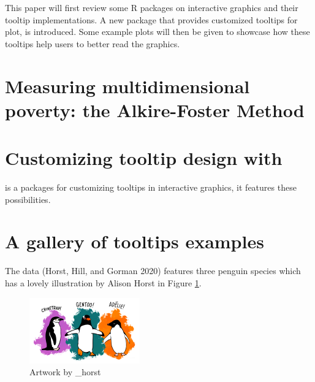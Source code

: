 This paper will first review some R packages on interactive graphics and their tooltip implementations. A new package  that provides customized tooltips for plot, is introduced. Some example plots will then be given to showcase how these tooltips help users to better read the graphics.

\hypertarget{measuring-multidimensional-poverty-the-alkire-foster-method}{%
\section{Measuring multidimensional poverty: the Alkire-Foster Method}\label{measuring-multidimensional-poverty-the-alkire-foster-method}}

\hypertarget{customizing-tooltip-design-with}{%
\section{\texorpdfstring{Customizing tooltip design with }{Customizing tooltip design with }}\label{customizing-tooltip-design-with}}

 is a packages for customizing tooltips in interactive graphics, it features these possibilities.

\hypertarget{a-gallery-of-tooltips-examples}{%
\section{A gallery of tooltips examples}\label{a-gallery-of-tooltips-examples}}

The  data (Horst, Hill, and Gorman 2020) features three penguin species which has a lovely illustration by Alison Horst in Figure \ref{fig:penguins-alison}.

\begin{figure}
\includegraphics[width=1\linewidth,height=0.3\textheight]{penguins} \caption{Artwork by \@allison\_horst}\label{fig:penguins-alison}
\end{figure}

